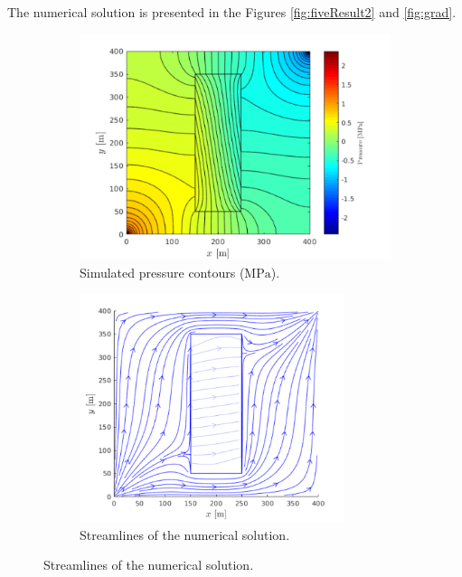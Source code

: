 \documentclass[review]{elsarticle}
\begin{document}
The numerical solution is presented in the Figures \ref{fig:fiveResult2} and \ref{fig:grad}.













\begin{figure}[H]
	\centering
	\begin{subfigure}[b]{0.45\textwidth}
		\centering
		\includegraphics[width=\textwidth]{./Figures/Examples/FiveSpot_Hetero/contourHetero.pdf}
		\caption[Test geometry 2]{Simulated pressure contours ($\mathrm{MPa}$).}
		\label{fig:5puntosAni}
	\end{subfigure}
	\begin{subfigure}[b]{0.45\textwidth}
		\centering
		\includegraphics[width=0.85\textwidth]{./Figures/Examples/FiveSpot_Hetero/StreamlinesHetero.pdf}
		\caption[Test geometry 2]{Streamlines of the numerical solution.}
		\label{fig:5puntosAnistream}
	\end{subfigure}


\end{figure}
\end{document}
